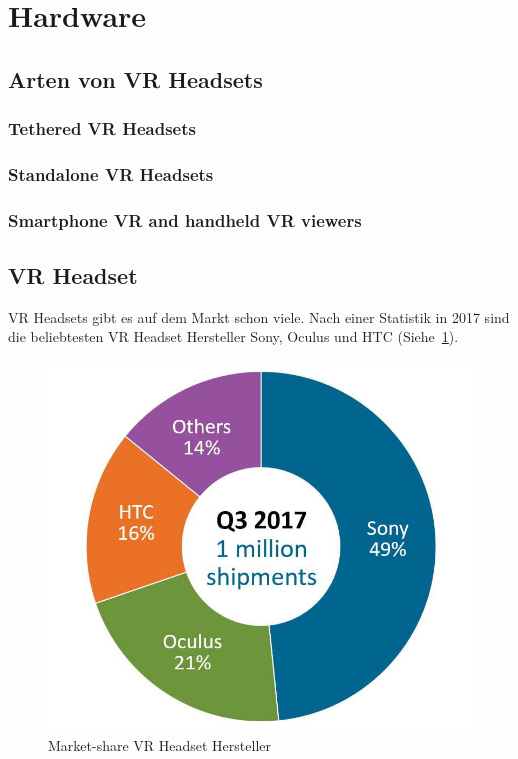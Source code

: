 \usepackage{wasysym}\section{Hardware}

\subsection{Arten von VR Headsets}

\subsubsection{Tethered VR Headsets}

\subsubsection{Standalone VR Headsets}

\subsubsection{Smartphone VR and handheld VR viewers}

\subsection{VR Headset}\label{sec:vr-headset}

VR Headsets gibt es auf dem Markt schon viele.
Nach einer Statistik in 2017 sind die beliebtesten VR Headset Hersteller Sony, Oculus und HTC (Siehe~\ref{fig:vr_headset_manufacturer_marketshare}).

\begin{figure}
    \includegraphics[scale=0.5]{pics/vr_headset_manufacturer_marketshare}
    \caption{Market-share VR Headset Hersteller~\cite{MARTINDALE_2017}}
    \label{fig:vr_headset_manufacturer_marketshare}
\end{figure}

